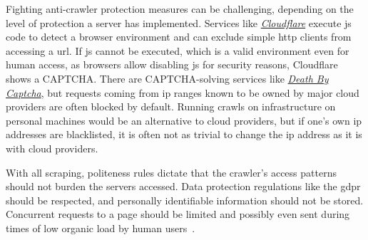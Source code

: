 Fighting anti-crawler protection measures can be challenging, depending on the level of protection a server has implemented.
Services like \href{https://www.cloudflare.com/}{\textit{Cloudflare}} execute \ac{js} code to detect a browser environment and can exclude simple \ac{http} clients from accessing a \ac{url}.
If \ac{js} cannot be executed, which is a valid environment even for human access, as browsers allow disabling \ac{js} for security reasons, Cloudflare shows a CAPTCHA.
There are CAPTCHA-solving services like \href{https://deathbycaptcha.com/}{\textit{Death By Captcha}}, but requests coming from \ac{ip} ranges known to be owned by major cloud providers are often blocked by default.
Running crawls on infrastructure on personal machines would be an alternative to cloud providers, but if one's own \ac{ip} addresses are blacklisted, it is often not as trivial to change the \ac{ip} address as it is with cloud providers.

With all scraping, politeness rules dictate that the crawler's access patterns should not burden the servers accessed.
Data protection regulations like the \ac{gdpr} should be respected, and personally identifiable information should not be stored.
Concurrent requests to a page should be limited and possibly even sent during times of low organic load by human users~\cite{Patel2020}.
